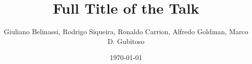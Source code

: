 \documentclass{beamer}
\title[Short title]{Full Title of the Talk} %
\author{Giuliano Belinassi, Rodrigo Siqueira, Ronaldo Carrion, Alfredo Goldman, Marco D. Gubitoso} %
\institute[IME-USP] %
{
Universidade de São Paulo \\ %
\medskip
\textit{giuliano.belinassi@usp.br} %
}
\date{\today} %
\begin{document}
\begin{frame}
\titlepage %
\end{frame}



%
%
%
%
\end{document}
